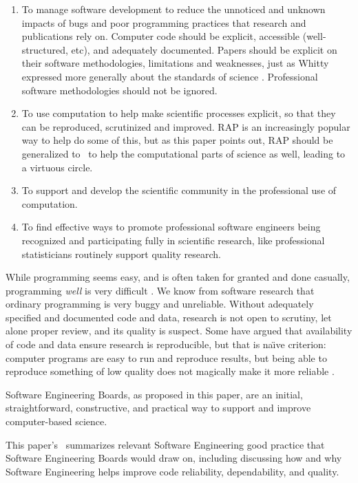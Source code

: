 \documentclass{comjnl}
\begin{document}
\begin{enumerate}\raggedright
\item 
To manage software development to reduce the unnoticed and unknown impacts of bugs and poor programming practices that research and publications rely on. Computer code should be explicit, accessible (well-structured, etc), and adequately documented. Papers should be explicit on their software methodologies, limitations and weaknesses, just as Whitty expressed more generally about the standards of science \cite{whitty}. Professional software methodologies should not be ignored.

\item 
To use computation to help make scientific processes explicit, so that they can be reproduced, scrutinized and improved. RAP is an increasingly popular way to help do some of this, but as this paper points out, RAP should be generalized to \RAPstar\ to help the computational parts of science as well, leading to a virtuous circle.

\item
To support and develop the scientific community in the professional use of computation.

\item
To find effective ways to promote professional software engineers being recognized and participating  fully in scientific research, like professional statisticians routinely support quality research.
\end{enumerate}

While programming seems easy, and is often taken for granted and done casually, programming \emph{well\/} is very difficult \cite{fixit}. We know from software research that ordinary programming is very buggy and unreliable. Without adequately specified and documented code and data, research is not open to scrutiny, let alone proper review, and its quality is suspect. Some have argued that availability of code and data ensure research is reproducible, but that is na\"\i ve criterion: computer programs are easy to run and reproduce results, but being able to reproduce something of low quality does not magically make it more reliable \cite{reproducibility,relit,popper-conjectures-refutations}. 

Software Engineering Boards, as proposed in this paper, are an initial, straightforward, constructive, and practical way to support and improve computer-based science. 

This paper's \supplement\ summarizes relevant Software Engineering good practice that Software Engineering Boards would draw on, including discussing how and why Software Engineering helps improve code reliability, dependability, and quality.
\end{document}
